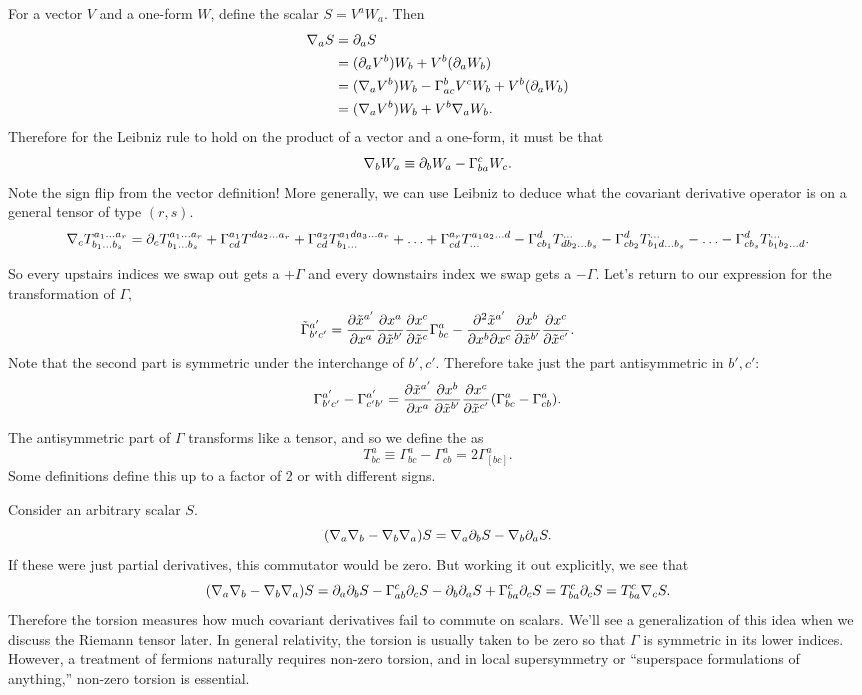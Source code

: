 For a vector $V$ and a one-form $W$, define the scalar $S=V^a W_a$. Then
\begin{align*}
\nabla_a S&= \partial_a S\\
&= (\partial_a V^b)W_b+ V^b(\partial_a W_b)\\
&= (\nabla_a V^b)W_b- \Gamma^b_{ac} V^c W_b+V^b(\partial_a W_b)\\
&= (\nabla_a V^b)W_b+ V^b \nabla_a W_b.
\end{align*}
Therefore for the Leibniz rule to hold on the product of a vector and a one-form, it must be that
$$\nabla_b W_a \equiv \partial_b W_a - \Gamma^c_{ba}W_c.$$
Note the sign flip from the vector definition! More generally, we can use Leibniz to deduce what the covariant derivative operator is on a general tensor of type $(r,s)$.
$$\nabla_c T^{a_1\ldots a_r}_{b_1\ldots b_s} = \partial_c T^{a_1\ldots a_r}_{b_1\ldots b_s}+ 
\Gamma^{a_1}_{cd} T^{da_2 \ldots a_r}+\Gamma^{a_2}_{cd} T^{a_1 d a_3 \ldots a_r}_{b_1\ldots}+\ldots + \Gamma^{a_r}_{cd}T^{a_1a_2\ldots d}_{\ldots} - \Gamma^d_{cb_1}T^{\ldots}_{db_2 \ldots b_s}- \Gamma^d_{cb_2} T^{\ldots}_{b_1 d \ldots b_s}-\ldots - \Gamma^d_{cb_s} T^{\ldots}_{b_1 b_2 \ldots d}.$$

So every upstairs indices we swap out gets a $+\Gamma$ and every downstairs index we swap gets a $-\Gamma$. Let's return to our expression for the transformation of $\Gamma,$
$$\tilde \Gamma^{a'}_{b'c'}=\frac{\partial \tilde x^{a'}}{\partial x^a} \frac{ \partial x^a}{\partial \tilde x^{b'}}\frac{\partial x^c}{\partial \tilde x^c} \Gamma^a_{bc}-\frac{\partial^2 \tilde x^{a'}}{\partial x^b \partial x^c}\frac{\partial x^b}{\partial \tilde x^{b'}}\frac{\partial x^c}{\partial\tilde x^{c'}}.$$
Note that the second part is symmetric under the interchange of $b',c'$. Therefore take just the part antisymmetric in $b',c'$:
$$\Gamma^{a'}_{b'c'}-\Gamma^{a'}_{c'b'}=\frac{\partial \tilde x^{a'}}{\partial x^a}\frac{\partial x^b}{\partial \tilde x^{b'}}\frac{\partial x^c}{\partial \tilde x^{c'}}(\Gamma^a_{bc}-\Gamma^a_{cb}).$$
\begin{defn}
The antisymmetric part of $\Gamma$ transforms like a tensor, and so we define the  as
$$T^a_{bc}\equiv\Gamma^a_{bc}-\Gamma^a_{cb}=2\Gamma^a_{[bc]}.$$
Some definitions define this up to a factor of 2 or with different signs.
\end{defn}

Consider an arbitrary scalar $S$.
$$(\nabla_a \nabla_b-\nabla_b\nabla_a)S= \nabla_a \partial_b S- \nabla_b \partial_a S.$$
If these were just partial derivatives, this commutator would be zero. But working it out explicitly, we see that 
$$(\nabla_a \nabla_b-\nabla_b\nabla_a)S=\partial_a \partial_b S-\Gamma^c_{ab}\partial_c S -\partial_b \partial_a S + \Gamma^c_{ba}\partial_c S = T^c_{ba} \partial_c S = T^c_{ba}\nabla_c S.$$
Therefore the torsion measures how much covariant derivatives fail to commute on scalars. We'll see a generalization of this idea when we discuss the Riemann tensor later. In general relativity, the torsion is usually taken to be zero so that $\Gamma$ is symmetric in its lower indices. However, a treatment of fermions naturally requires non-zero torsion, and in local supersymmetry or ``superspace formulations of anything,'' non-zero torsion is essential.

